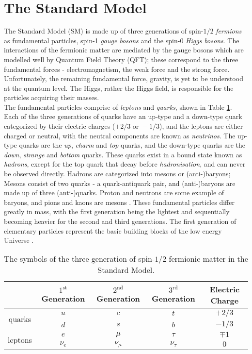 
\section{The Standard Model}
The Standard Model (SM) is made up of three generations of spin-$1/2$ \textit{fermions} as fundamental particles, spin-1 \textit{gauge bosons} and the spin-0 \textit{Higgs bosons}. The interactions of the fermionic matter are mediated by the gauge bosons which are modelled well by Quantum Field Theory (QFT); these correspond to the three fundamental forces - electromagnetism, the weak force and the strong force. Unfortunately, the remaining fundamental force, gravity, is yet to be understood at the quantum level. The Higgs, rather the Higgs field, is responsible for the particles acquiring their masses. \\

The fundamental particles comprise of \textit{leptons} and \textit{quarks}, shown in Table \ref{tab:SMFerm}. Each of the three generations of quarks have an up-type and a down-type quark categorized by their electric charges ($+2/3 \text{ or } -1/3$), and the leptons are either charged or neutral, with the neutral components are known as \textit{neutrinos}. The up-type quarks are the \textit{up}, \textit{charm} and \textit{top} quarks, and the down-type quarks are the \textit{down}, \textit{strange} and \textit{bottom} quarks. These quarks exist in a bound state known as \textit{hadrons}, except for the top quark that decay before \textit{hadronisation}, and can never be observed directly. Hadrons are categorized into mesons or (anti-)baryons; Mesons consist of two quarks - a quark-antiquark pair, and (anti-)baryons are made up of three (anti-)quarks. Proton and neutrons are some example of baryons, and pions and kaons are mesons \cite{thomson2013modern}. These fundamental particles differ greatly in mass, with the first generation being the lightest and sequentially becoming heavier for the second and third generations. The first generation of elementary particles represent the basic building blocks of the low energy Universe \cite{thomson2013modern}. \\

\begin{table}[htbp]
    \centering
    \begin{tabular}{c||c|c|c|c}
    \toprule
    & $1^{\text{st}}$ Generation & $2^{\text{nd}}$ Generation & $3^{\text{rd}}$ Generation & Electric Charge \\
    \midrule
    \multirow{2}{1.2cm}{quarks} & $u$ & $c$ & $t$ & $+2/3$ \\
     & $d$ & $s$ & $b$ & $-1/3$ \\
    \midrule
    \multirow{2}{1.2cm}{leptons} & $e$ & $\mu$ & $\tau$ & $\mp1$ \\
     & $\nu_e$ & $\nu_\mu$ & $\nu_\tau$ & $0$ \\
    \bottomrule
    \end{tabular}
    \caption{The symbols of the three generation of spin-$1/2$ fermionic matter in the Standard Model.}
    \label{tab:SMFerm}
\end{table}



